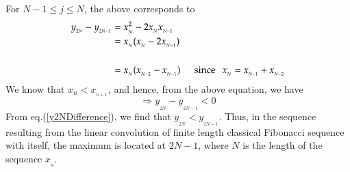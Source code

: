 \begin{multicols}{2}
For\hspace{0.1in} $N-1 \leq j \leq N$,\hspace{0.1in} the above corresponds to
\begin{align}
y_{_{2N}} - y_{_{2N-1}} &= x_{_N}^2 - 2x_{_N}x_{_{N-1}}\label{eq-16.4}\\
&= x_{_N}(x_{_N} - 2x_{_{N-1}})\nonumber\\~\nonumber\\
&= x_{_N}(x_{_{N-2}}-x_{_{N-1}})\hspace{0.2in}\textup{since}\hspace{0.1in} x_{_N} = x_{_{N-1}} + x_{_{N-2}}\nonumber
\end{align} 
We know that \hspace{0.1in} $x_{{n}} < x_{_{n+1}}$, \hspace{0.1in} and hence, from the above equation, we have
\begin{equation}
\Rightarrow y_{_{2N}} - y_{_{2N-1}}< 0 \label{eq-16.5}
\end{equation}
From eq.(\ref{y2NDifference}), we find that $y_{_{2N}} < y_{_{2N-1}}$. Thus, in the sequence resulting from the linear convolution of finite length classical Fibonacci sequence with itself, the maximum is located at $2N-1$, where $N$ is the length of the sequence $x_{_n}$.


\end{multicols}
